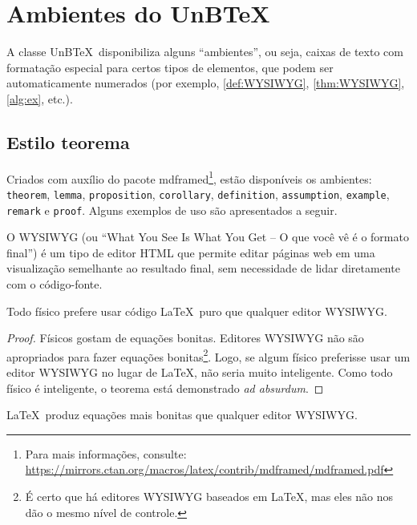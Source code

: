 \chapter{Ambientes do UnB\TeX}

A classe UnB\TeX\ disponibiliza alguns ``ambientes'', ou seja, caixas de texto com formatação especial para certos tipos de elementos, que podem ser automaticamente numerados (por exemplo, \cref{def:WYSIWYG}, \cref{thm:WYSIWYG}, \cref{alg:ex}, etc.).

\section{Estilo teorema}

Criados com auxílio do pacote \textsf{mdframed}\footnote{Para mais informações, consulte: \url{https://mirrors.ctan.org/macros/latex/contrib/mdframed/mdframed.pdf}}, estão disponíveis os ambientes: \texttt{theorem}, \texttt{lemma}, \texttt{proposition}, \texttt{corollary}, \texttt{definition}, \texttt{as\-sumption}, \texttt{example}, \texttt{remark} e \texttt{proof}. Alguns exemplos de uso são apresentados a seguir.

\begin{definition}\label{def:WYSIWYG}
O WYSIWYG (ou ``What You See Is What You Get -- O que você vê é o formato final'') é um tipo de editor HTML que permite editar páginas web em uma visualização semelhante ao resultado final, sem necessidade de lidar diretamente com o código-fonte.
\end{definition}

\begin{theorem}\label{thm:WYSIWYG}
    Todo físico prefere usar código \LaTeX\ puro que qualquer editor WYSIWYG.
\end{theorem}

\begin{proof}
    Físicos gostam de equações bonitas. Editores WYSIWYG não são apropriados para fazer equações bonitas\footnote{É certo que há editores WYSIWYG baseados em \LaTeX, mas eles não nos dão o mesmo nível de controle.}. Logo, se algum físico preferisse usar um editor WYSIWYG no lugar de \LaTeX, não seria muito inteligente. Como todo físico é inteligente, o teorema está demonstrado \textit{ad absurdum}.
\end{proof}

\begin{remark}\label{rmk:1}
    \LaTeX\ produz equações mais bonitas que qualquer editor WYSIWYG.
\end{remark}

